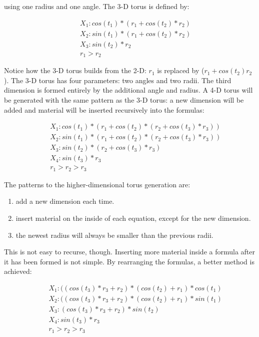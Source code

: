 \noindent using one radius and one angle. The 3-D torus is defined by:

\begin{eqnarray*}
&&X_1: cos(t_1) * (r_1 + cos(t_2) * r_2)\\
&&X_2: sin(t_1) * (r_1 + cos(t_2) * r_2)\\
&&X_3: sin(t_2) * r_2\\
&&r_1>r_2
\end{eqnarray*}

Notice how the 3-D torus builds from the 2-D: $r_1$ is replaced by
($r_1+cos(t_2)r_2$). The 3-D torus has four parameters: two angles and
two radii. The third dimension is formed entirely by the additional
angle and radius.  A 4-D torus will be generated with the same pattern
as the 3-D torus: a new dimension will be added and material will be
inserted recursively into the formulas:

\begin{eqnarray*}
&&X_1: cos(t_1) * (r_1 + cos(t_2) * (r_2 + cos(t_3) * r_3))\\
&&X_2: sin(t_1) * (r_1 + cos(t_2) * (r_2 + cos(t_3) * r_3))\\
&&X_3: sin(t_2) * (r_2 + cos(t_3) * r_3)\\
&&X_4: sin(t_3) * r_3\\
&&r_1 > r_2 > r_3
\end{eqnarray*}

The patterns to the higher-dimensional torus generation are:

\begin{enumerate} \itemsep 0in
\item add a new dimension each time.
\item insert material on the inside of each equation, except for the
  new dimension.
\item the newest radius will always be smaller than the previous radii.
\end{enumerate}

This is not easy to recurse, though. Inserting more material inside a
formula after it has been formed is not simple. By rearranging the
formulas, a better method is achieved:

\begin{eqnarray*}
&&X_1: ((cos(t_3) * r_3 + r_2) * (cos(t_2) + r_1) * cos(t_1)\\
&&X_2: ((cos(t_3) * r_3 + r_2) * (cos(t_2) + r_1) * sin(t_1)\\
&&X_3:  (cos(t_3) * r_3 + r_2) * sin(t_2)\\
&&X_4:   sin(t_3) * r_3\\
&&r_1 > r_2 > r_3
\end{eqnarray*}

